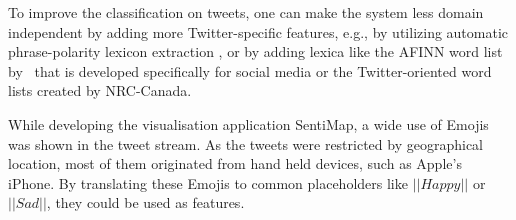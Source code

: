 To improve the classification on tweets, one can make the system less domain independent by adding more Twitter-specific features, e.g., by utilizing automatic phrase-polarity lexicon extraction \citep{VelikovichEA:10}, or by adding lexica like the AFINN word list by~\cite{article:afinn} that is developed specifically for social media or the Twitter-oriented word lists created by NRC-Canada.

While developing the visualisation application SentiMap, a wide use of Emojis was shown in the tweet stream. As the tweets were restricted by geographical location, most of them originated from hand held devices, such as Apple's iPhone. By translating these Emojis to common placeholders like $||Happy||$ or $||Sad||$, they could be used as features.